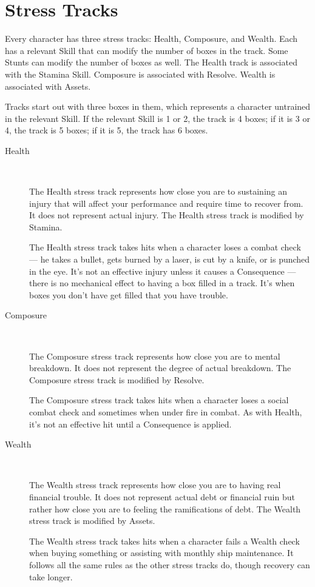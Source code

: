 \section{Stress Tracks}
\label{sec:Stress Tracks}

Every character has three stress tracks: Health, Composure, and Wealth. Each has a relevant Skill that can modify the number of boxes in the track. Some Stunts can modify the number of boxes as well. The Health track is associated with the Stamina Skill. Composure is associated with Resolve. Wealth is associated with Assets.

Tracks start out with three boxes in them, which represents a character untrained in the relevant Skill. If the relevant Skill is 1 or 2, the track is 4 boxes; if it is 3 or 4, the track is 5 boxes; if it is 5, the track has 6 boxes.

\begin{description}
\item[Health]~

The Health stress track represents how close you are to sustaining an injury that will affect your performance and require time to recover from. It does not represent actual injury. The Health stress track is modified by Stamina.

The Health stress track takes hits when a character loses a combat check --- he takes a bullet, gets burned by a laser, is cut by a knife, or is punched in the eye. It's not an effective injury unless it causes a Consequence --- there is no mechanical effect to having a box filled in a track. It's when boxes you don't have get filled that you have trouble.

\item[Composure]~

The Composure stress track represents how close you are to mental breakdown. It does not represent the degree of actual breakdown. The Composure stress track is modified by Resolve.

The Composure stress track takes hits when a character loses a social combat check and sometimes when under fire in combat. As with Health, it's not an effective hit until a Consequence is applied.

\item[Wealth]~

The Wealth stress track represents how close you are to having real financial trouble. It does not represent actual debt or financial ruin but rather how close you are to feeling the ramifications of debt. The Wealth stress track is modified by Assets.

The Wealth stress track takes hits when a character fails a Wealth check when buying something or assisting with monthly ship maintenance. It follows all the same rules as the other stress tracks do, though recovery can take longer.

\end{description}





